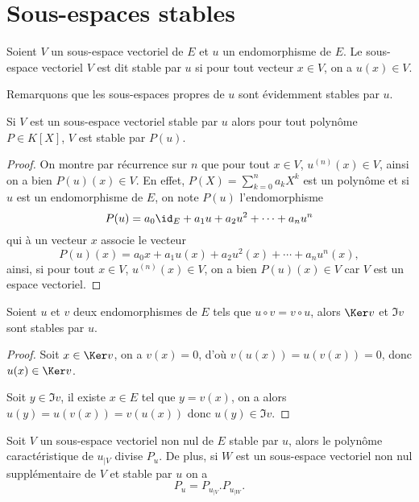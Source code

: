 \documentclass[class=report,crop=false]{standalone}
\begin{document}
\section{Sous-espaces stables}

\begin{definition}
Soient $V$ un sous-espace vectoriel de $E$ et $u$ un endomorphisme de $E$. 
Le sous-espace vectoriel $V$ est dit stable par $u$ si pour tout vecteur 
$x\in V$, on a $u(x)\in V$.
\end{definition} 

Remarquons que les sous-espaces propres de $u$ sont évidemment stables par $u$.

\begin{proposition}
Si $V$ est un sous-espace vectoriel stable par $u$ alors pour tout polynôme $P\in K[X]$, $V$ est stable 
par $P(u)$.
\end{proposition} 

\begin{proof}
On montre par récurrence sur $n$ que pour tout $x\in V$, $u^{(n)}(x)\in V$, ainsi on a bien $P(u)(x)\in V$. En effet, $P(X)=\sum_{k=0}^n a_k X^k$ est un polynôme et si $u$ est un endomorphisme de $E$, on note $P(u)$ l'endomorphisme
$$P(u)=a_0 \id_E+a_1 u+a_2 u^2+\cdots+a_n u^n$$
qui à un vecteur $x$ associe le vecteur
$$P(u)(x)=a_0 x+a_1 u(x)+a_2 u^2(x)+\cdots+a_n u^n(x),$$
ainsi, si pour tout $x\in V$, $u^{(n)}(x)\in V$, on a bien $P(u)(x)\in V$ car $V$ est un espace vectoriel.

\end{proof}



\begin{proposition}
Soient $u$ et $v$ deux endomorphismes de $E$ tels que $u\circ v=v\circ u$, 
alors $\Ker v$ et $\Im v$ sont stables par $u$.
\end{proposition} 

\begin{proof}
Soit $x\in\Ker v$, on  a $v(x)=0$, d'où $v(u(x))=u(v(x))=0$, donc $u(x)\in\Ker v$.

Soit $y\in\Im v$, il existe $x\in E$ tel que $y=v(x)$, on a alors 
$u(y)=u(v(x))=v(u(x))$ donc $u(y)\in \Im v$.
\end{proof} 



\begin{proposition}
Soit $V$ un sous-espace vectoriel non nul de $E$ stable par $u$, alors le polynôme caractéristique de 
$u_{|V}$ divise $P_u$. De plus, si $W$ est un sous-espace vectoriel non nul supplémentaire de $V$ et stable par $u$ on a
$$P_u=P_{u_{|V}}.P_{u_{|W}}.$$
\end{proposition} 
\end{document}
